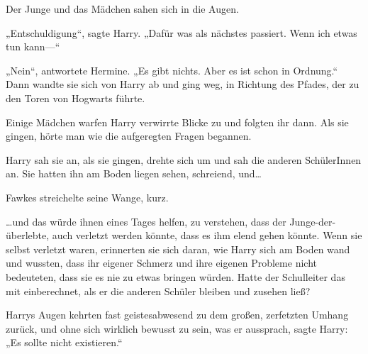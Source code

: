 Der Junge und das Mädchen sahen sich in die Augen.

„Entschuldigung“, sagte Harry. „Dafür was als nächstes passiert. Wenn ich etwas tun kann—“

„Nein“, antwortete Hermine. „Es gibt nichts. Aber es ist schon in Ordnung.“ Dann wandte sie sich von Harry ab und ging weg, in Richtung des Pfades, der zu den Toren von Hogwarts führte.

Einige Mädchen warfen Harry verwirrte Blicke zu und folgten ihr dann. Als sie gingen, hörte man wie die aufgeregten Fragen begannen.

Harry sah sie an, als sie gingen, drehte sich um und sah die anderen SchülerInnen an. Sie hatten ihn am Boden liegen sehen, schreiend, und…

Fawkes streichelte seine Wange, kurz.

…und das würde ihnen eines Tages helfen, zu verstehen, dass der Junge-der-überlebte, auch verletzt werden könnte, dass es ihm elend gehen könnte. Wenn sie selbst verletzt waren, erinnerten sie sich daran, wie Harry sich am Boden wand und wussten, dass ihr eigener Schmerz und ihre eigenen Probleme nicht bedeuteten, dass sie es nie zu etwas bringen würden. Hatte der Schulleiter das mit einberechnet, als er die anderen Schüler bleiben und zusehen ließ?

Harrys Augen kehrten fast geistesabwesend zu dem großen, zerfetzten Umhang zurück, und ohne sich wirklich bewusst zu sein, was er aussprach, sagte Harry: „Es sollte nicht existieren.“

